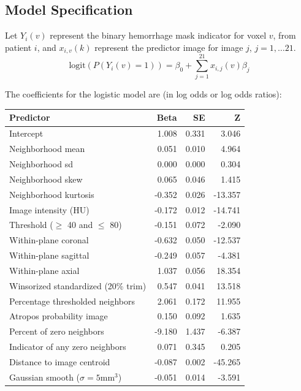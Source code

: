 \documentclass{elsarticle_nonatbib}\usepackage[]{graphicx}\usepackage[]{color}
\begin{document}
\subsection{Model Specification}
\label{sec:modspec}

Let $Y_{i}(v)$ represent the binary hemorrhage mask indicator for voxel $v$, from patient $i$, and $x_{i,v}(k)$ represent the predictor image for image $j$, $j = 1, \dots 21$.
$$
\text{logit}\left(P(Y_{i}(v) = 1)\right) = \beta_0 + \sum_{j = 1}^{21} x_{i, j}(v)\beta_{j}
$$

The coefficients for the logistic model are (in log odds or log odds ratios):

\begin{table}[ht]
\centering
\begin{tabular}{lrrr}
  \hline
Predictor & Beta & SE & Z \\ 
  \hline
Intercept & 1.008 & 0.331 & 3.046 \\ 
  Neighborhood mean & 0.051 & 0.010 & 4.964 \\ 
  Neighborhood sd & 0.000 & 0.000 & 0.304 \\ 
  Neighborhood skew & 0.065 & 0.046 & 1.415 \\ 
  Neighborhood kurtosis & -0.352 & 0.026 & -13.357 \\ 
  Image intensity (HU) & -0.172 & 0.012 & -14.741 \\ 
  Threshold ($\geq$ 40 and $\leq$ 80) & -0.151 & 0.072 & -2.090 \\ 
  Within-plane coronal & -0.632 & 0.050 & -12.537 \\ 
  Within-plane sagittal & -0.249 & 0.057 & -4.381 \\ 
  Within-plane axial & 1.037 & 0.056 & 18.354 \\ 
  Winsorized standardized (20\% trim) & 0.547 & 0.041 & 13.518 \\ 
  Percentage thresholded neighbors & 2.061 & 0.172 & 11.955 \\ 
  Atropos probability image & 0.150 & 0.092 & 1.635 \\ 
  Percent of zero neighbors & -9.180 & 1.437 & -6.387 \\ 
  Indicator of any zero neighbors & 0.071 & 0.345 & 0.205 \\ 
  Distance to image centroid & -0.087 & 0.002 & -45.265 \\ 
  Gaussian smooth ($\sigma = 5$mm$^3$) & -0.051 & 0.014 & -3.591 \\ 

\end{tabular}
\end{table}
\end{document}
